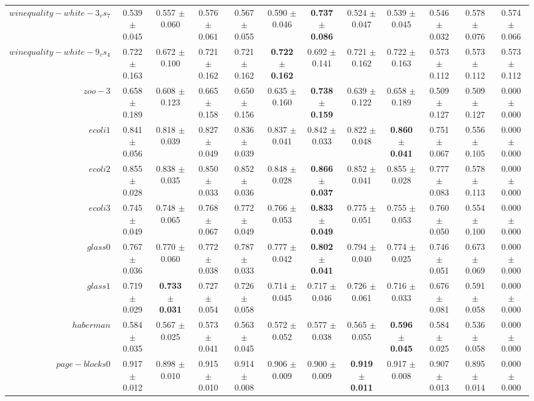 \begin{table}[!ht]
{\begin{tabular}{r c c c c c c c c c c c}
$winequality-white-3_vs_7$ & 0.539 $\pm$ 0.045 & 0.557 $\pm$ 0.060 & 0.576 $\pm$ 0.061 & 0.567 $\pm$ 0.055 & 0.590 $\pm$ 0.046 & \textbf{0.737 $\pm$ 0.086} & 0.524 $\pm$ 0.047 & 0.539 $\pm$ 0.045 & 0.546 $\pm$ 0.032 & 0.578 $\pm$ 0.076 & 0.574 $\pm$ 0.066 \\
$winequality-white-9_vs_4$ & 0.722 $\pm$ 0.163 & 0.672 $\pm$ 0.100 & 0.721 $\pm$ 0.162 & 0.721 $\pm$ 0.162 & \textbf{0.722 $\pm$ 0.162} & 0.692 $\pm$ 0.141 & 0.721 $\pm$ 0.162 & 0.722 $\pm$ 0.163 & 0.573 $\pm$ 0.112 & 0.573 $\pm$ 0.112 & 0.573 $\pm$ 0.112 \\
$zoo-3$ & 0.658 $\pm$ 0.189 & 0.608 $\pm$ 0.123 & 0.665 $\pm$ 0.158 & 0.650 $\pm$ 0.156 & 0.635 $\pm$ 0.160 & \textbf{0.738 $\pm$ 0.159} & 0.639 $\pm$ 0.122 & 0.658 $\pm$ 0.189 & 0.509 $\pm$ 0.127 & 0.509 $\pm$ 0.127 & 0.000 $\pm$ 0.000 \\
$ecoli1$ & 0.841 $\pm$ 0.056 & 0.818 $\pm$ 0.039 & 0.827 $\pm$ 0.049 & 0.836 $\pm$ 0.039 & 0.837 $\pm$ 0.041 & 0.842 $\pm$ 0.033 & 0.822 $\pm$ 0.048 & \textbf{0.860 $\pm$ 0.041} & 0.751 $\pm$ 0.067 & 0.556 $\pm$ 0.105 & 0.000 $\pm$ 0.000 \\
$ecoli2$ & 0.855 $\pm$ 0.028 & 0.838 $\pm$ 0.035 & 0.850 $\pm$ 0.033 & 0.852 $\pm$ 0.036 & 0.848 $\pm$ 0.028 & \textbf{0.866 $\pm$ 0.037} & 0.852 $\pm$ 0.041 & 0.855 $\pm$ 0.028 & 0.777 $\pm$ 0.083 & 0.578 $\pm$ 0.113 & 0.000 $\pm$ 0.000 \\
$ecoli3$ & 0.745 $\pm$ 0.049 & 0.748 $\pm$ 0.065 & 0.768 $\pm$ 0.067 & 0.772 $\pm$ 0.049 & 0.766 $\pm$ 0.053 & \textbf{0.833 $\pm$ 0.049} & 0.775 $\pm$ 0.051 & 0.755 $\pm$ 0.053 & 0.760 $\pm$ 0.050 & 0.554 $\pm$ 0.100 & 0.000 $\pm$ 0.000 \\
$glass0$ & 0.767 $\pm$ 0.036 & 0.770 $\pm$ 0.060 & 0.772 $\pm$ 0.038 & 0.787 $\pm$ 0.033 & 0.777 $\pm$ 0.042 & \textbf{0.802 $\pm$ 0.041} & 0.794 $\pm$ 0.040 & 0.774 $\pm$ 0.025 & 0.746 $\pm$ 0.051 & 0.673 $\pm$ 0.069 & 0.000 $\pm$ 0.000 \\
$glass1$ & 0.719 $\pm$ 0.029 & \textbf{0.733 $\pm$ 0.031} & 0.727 $\pm$ 0.054 & 0.726 $\pm$ 0.058 & 0.714 $\pm$ 0.045 & 0.717 $\pm$ 0.046 & 0.726 $\pm$ 0.061 & 0.716 $\pm$ 0.033 & 0.676 $\pm$ 0.081 & 0.591 $\pm$ 0.058 & 0.000 $\pm$ 0.000 \\
$haberman$ & 0.584 $\pm$ 0.035 & 0.567 $\pm$ 0.025 & 0.573 $\pm$ 0.041 & 0.563 $\pm$ 0.045 & 0.572 $\pm$ 0.052 & 0.577 $\pm$ 0.038 & 0.565 $\pm$ 0.055 & \textbf{0.596 $\pm$ 0.045} & 0.584 $\pm$ 0.025 & 0.536 $\pm$ 0.058 & 0.000 $\pm$ 0.000 \\
$page-blocks0$ & 0.917 $\pm$ 0.012 & 0.898 $\pm$ 0.010 & 0.915 $\pm$ 0.010 & 0.914 $\pm$ 0.008 & 0.906 $\pm$ 0.009 & 0.900 $\pm$ 0.009 & \textbf{0.919 $\pm$ 0.011} & 0.917 $\pm$ 0.008 & 0.907 $\pm$ 0.013 & 0.895 $\pm$ 0.014 & 0.000 $\pm$ 0.000 \\

\end{tabular}}
\end{table}
